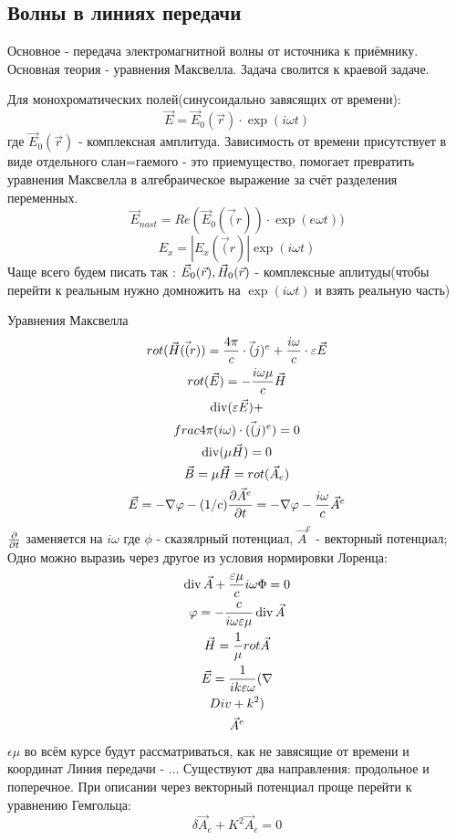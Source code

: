 \subsection{Волны в линиях передачи}
Основное - передача электромагнитной волны от источника к приёмнику.
Основная теория - уравнения Максвелла. Задача сволится к краевой задаче.

 Для монохроматических полей(синусоидально завясящих от времени):
  \begin{equation}
	\vec{E} = \vec{E}_0(\vec{r})\cdot \exp(i\omega t)
\end{equation}
где $\vec{E}_0(\vec{r})$ - комплексная амплитуда.
Зависимость от времени присутствует в виде отдельного слан=гаемого - это приемущество, помогает превратить уравнения Максвелла в алгебраическое выражение за счёт разделения переменных.
 \begin{equation}
 	\vec{E}_{nast} = Re(\vec{E}_0(\vec(r))\cdot \exp(e\omega t))
\end{equation}
\begin{equation}
	E_x = |E_x(\vec(r)| \exp(i\omega t)
\end{equation}
Чаще всего будем писать так : $\vec{E}_0\qty(\vec{r}), \vec{H}_0\qty(\vec{r})$ - комплексные аплитуды(чтобы перейти к реальным нужно домножить на $\exp(i\omega t)$  и взять реальную часть)
 
 	Уравнения Максвелла
\begin{gather}
 	rot(\vec{H}(\vec(r)) = \frac{4\pi}{c} \cdot \vec(j)^e + \frac{i \omega}{c} \cdot \varepsilon \vec{E}
\\
 	rot(\vec{E}) = -\frac{i \omega \mu}{c} \vec{H}
\\
 	\operatorname{div}(\varepsilon \vec{E}) + \\frac{4\pi}{(i\omega)} \cdot(\vec(j)^e) = 0
\\
 	\operatorname{div}(\mu \vec{H}) = 0
\\
 	\vec{B} = \mu \vec{H} = rot(\vec{A}_e)
\\
 	\vec{E} = - \nabla\varphi - (1/c) \frac{\partial \vec{A}^e}{\partial t} = - \nabla{\varphi} - \frac{i \omega}{c} \vec{A}^e
\end{gather}
$\pdv{t}$ заменяется на  $i \omega $ где 
$\phi$ - сказялрный потенциал, $\vec{A}^e$  - векторный потенциал;
Одно можно выразиь через другое из условия нормировки Лоренца:
\begin{gather}
	\operatorname{div}{\vec{A}} + \frac{\varepsilon \mu}{c} i \omega \Phi = 0\\
	\varphi = - \frac{c}{i \omega \varepsilon \mu} \operatorname{div}{\vec{A}}\\
	\vec{H} = \frac{1}{\mu} rot{\vec{A}}\\
	\vec{E} = \frac{1}{i k \varepsilon \omega} (\nabla\\Div + k^2)\\
 \vec{A}^e
\end{gather}
$ \epsilon \mu $  во всём курсе будут рассматриваться, как не завясящие от времени и координат
Линия передачи -  ...
Существуют два направления: продольное и поперечное.
При описании через векторный потенциал проще перейти к уравнению Гемгольца:
\begin{equation}
	\delta \vec{A}_e + K^2 \vec{A}_e = 0
\end{equation}

